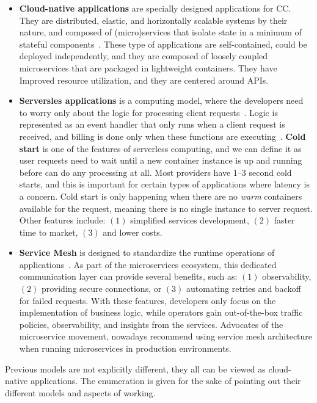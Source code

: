 \begin{itemize}
	\item \textbf{Cloud-native applications} are specially designed applications for CC. They are distributed, elastic, and horizontally scalable systems by their nature, and composed of (micro)services that isolate state in a minimum of stateful components~\cite{KratzkeQ17}. These type of applications are self-contained, could be deployed independently, and they are composed of loosely coupled microservices that are packaged in lightweight containers. They have Improved resource utilization, and they are centered around APIs.
	\item \textbf{Serversles applications} is a computing model, where the developers need to worry only about the logic for processing client requests~\cite{AdzicC17}. Logic is represented as an event handler that only runs when a client request is received, and billing is done only when these functions are executing~\cite{AdzicC17}. \textbf{Cold start} is one of the features of serverless computing, and we can define it as user requests need to wait until a new container instance is up and running before can do any processing at all. Most providers have 1–3 second cold starts, and this is important for certain types of applications where latency is a concern. Cold start is only happening when there are no \textit{warm} containers available for the request, meaning there is no single instance to server request. Other features include: $(1)$ simplified services development, $(2)$ faster time to market, $(3)$ and lower costs.
	\item \textbf{Service Mesh} is designed to standardize the runtime operations of applications~\cite{LiLGZH19}. As part of the microservices ecosystem, this dedicated communication layer can provide several benefits, such as: $(1)$ observability, $(2)$ providing secure connections, or $(3)$ automating retries and backoff for failed requests. With these features, developers only focus on the implementation of business logic, while operators gain out-of-the-box traffic policies, observability, and insights from the services. Advocates of the microservice movement, nowadays recommend using service mesh architecture when running microservices in production environments.
\end{itemize}

\noindent
Previous models are not explicitly different, they all can be viewed as cloud-native applications. The enumeration is given for the sake of pointing out their different models and aspects of working.


